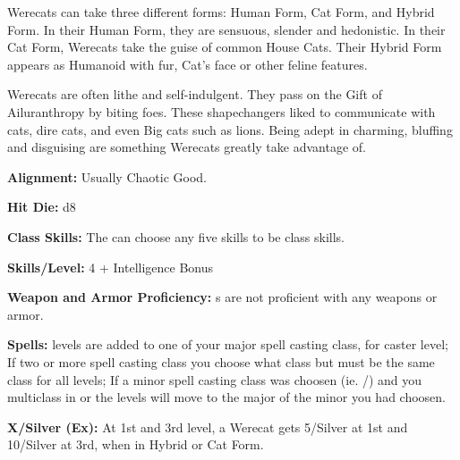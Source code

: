 
Werecats can take three different forms: Human Form, Cat Form, and Hybrid Form. In their Human Form, they are sensuous, slender and hedonistic. In their Cat Form, Werecats take the guise of common House Cats. Their Hybrid Form appears as Humanoid with fur, Cat's face or other feline features.

Werecats are often lithe and self-indulgent. They pass on the Gift of Ailuranthropy by biting foes. These shapechangers liked to communicate with cats, dire cats, and even Big cats such as lions. Being adept in charming, bluffing and disguising are something Werecats greatly take advantage of.

\textbf{Alignment:} Usually Chaotic Good.

\textbf{Hit Die:} d8

\textbf{Class Skills:} The \currentclassname{} can choose any five skills to be class skills.

\textbf{Skills/Level:} 4 + Intelligence Bonus

\poorbab{}
\poorfor{}
\goodref{}
\poorwil{}

\begin{classtable}
\end{classtable}

\classfeatures

\textbf{Weapon and Armor Proficiency:} \currentclassname{}s are not proficient with any weapons or armor.

\textbf{Spells:} \currentclassname{} levels are added to one of your major spell casting class, for caster level; If two or more spell casting class you choose what class but must be the same class for all \currentclassname{} levels; If a minor spell casting class was choosen (ie. /) and you multiclass in  or  the \currentclassname{} levels will move to the major of the minor you had choosen.

\textbf{ X/Silver (Ex):} At 1st and 3rd level, a Werecat gets  5/Silver at 1st and 10/Silver at 3rd, when in Hybrid or Cat Form.

